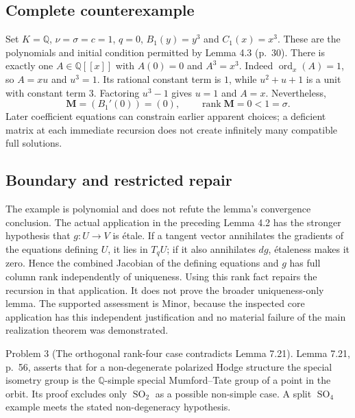 \documentclass[10pt]{article}
\begin{document}
\subsection*{Complete counterexample}
Set \(K=\mathbb Q\), \(\nu=\sigma=c=1\), \(q=0\), \(B_1(y)=y^3\) and \(C_1(x)=x^3\). These are the polynomials and initial condition permitted by Lemma 4.3 (p. 30). There is exactly one \(A\in\mathbb Q[[x]]\) with \(A(0)=0\) and \(A^3=x^3\). Indeed \(\operatorname{ord}_x(A)=1\), so \(A=xu\) and \(u^3=1\). Its rational constant term is \(1\), while \(u^2+u+1\) is a unit with constant term \(3\). Factoring \(u^3-1\) gives \(u=1\) and \(A=x\). Nevertheless, \[\boldsymbol M=(B_1'(0))=(0),\qquad
 \operatorname{rank}\boldsymbol M=0<1=\sigma .\] Later coefficient equations can constrain earlier apparent choices; a deficient matrix at each immediate recursion does not create infinitely many compatible full solutions.\par
\subsection*{Boundary and restricted repair}
The example is polynomial and does not refute the lemma’s convergence conclusion. The actual application in the preceding Lemma 4.2 has the stronger hypothesis that \(g:U\to V\) is étale. If a tangent vector annihilates the gradients of the equations defining \(U\), it lies in \(T_qU\); if it also annihilates \(dg\), étaleness makes it zero. Hence the combined Jacobian of the defining equations and \(g\) has full column rank independently of uniqueness. Using this rank fact repairs the recursion in that application. It does not prove the broader uniqueness-only lemma. The supported assessment is Minor, because the inspected core application has this independent justification and no material failure of the main realization theorem was demonstrated.\par
Problem 3 (The orthogonal rank-four case contradicts Lemma 7.21).  Lemma 7.21, p. 56, asserts that for a non-degenerate polarized Hodge structure the special isometry group is the \(\mathbb Q\)-simple special Mumford–Tate group of a point in the orbit. Its proof excludes only \(\operatorname{SO}_2\) as a possible non-simple case. A split \(\operatorname{SO}_4\) example meets the stated non-degeneracy hypothesis.\par
\end{document}
